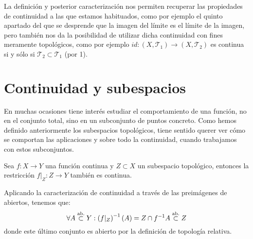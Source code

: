 \begin{obs}
La definición y posterior caracterización nos permiten recuperar las propiedades de continuidad a las que estamos habituados, como por ejemplo el quinto apartado del que se desprende que la imagen del límite es el límite de la imagen, pero también nos da la posibilidad de utilizar dicha continuidad con fines meramente topológicos, como por ejemplo $id: \left( X, \mathcal{T}_1 \right) \rightarrow \left( X, \mathcal{T}_2 \right)$ es continua si y sólo si $\mathcal{T}_2 \subset \mathcal{T}_1$ (por 1).
\end{obs}

\section{Continuidad y subespacios}%
\label{sec:continuidad_y_subespacios}
En muchas ocasiones tiene interés estudiar el comportamiento de una función, no en el conjunto total, sino en un subconjunto de puntos concreto. Como hemos definido anteriormente los subespacios topológicos, tiene sentido querer ver cómo se comportan las aplicaciones y sobre todo la continuidad, cuando trabajamos con estos subconjuntos.

\begin{prop}
Sea $f: X \rightarrow Y$ una función continua y $Z \subset X$ un subespacio topológico, entonces la restricción $f|_Z : Z \rightarrow Y$ también es continua.
\end{prop}
\begin{demo}
Aplicando la caracterización de continuidad a través de las preimágenes de abiertos, tenemos que:
\[
\forall A \stackrel{\text{ab.}}{\subset} Y : \left( f|_Z \right)^{-1} \left( A \right) = Z \cap f^{-1} A \stackrel{\text{ab.}}{\subset} Z
\]
donde este último conjunto es abierto por la definición de topología relativa.
\end{demo}

